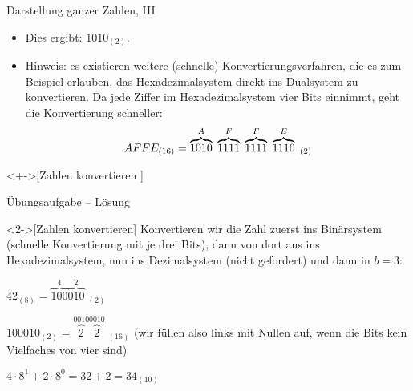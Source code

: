 \begin{frame}[fragile]{Darstellung ganzer Zahlen, III}
\begin{itemize}[<+(1)->]
    \item Dies ergibt: \(1010_{(2)}\).
    \item Hinweis: es existieren weitere (schnelle) Konvertierungsverfahren,\pause{} die es zum Beispiel erlauben, das Hexadezimalsystem direkt ins Dualsystem zu konvertieren.\pause{} Da jede Ziffer im Hexadezimalsystem vier Bits einnimmt, geht die Konvertierung schneller:\pause{} \[
        AFFE_{(16)} = \overbrace{1010}^{A}\;\overbrace{1111}^{F}\;\overbrace{1111}^{F}\;\overbrace{1110}^{E}\;{}_{(2)}\vspace*{-0.4cm}
    \]
\end{itemize}
\ifull{}%
\begin{exercise}<+->[Zahlen konvertieren ]
\end{exercise}\fi
\end{frame}

\ifull
\begin{frame}[c]{Übungsaufgabe -- Lösung}
\begin{solve}<2->[Zahlen konvertieren]
    \pause{}Konvertieren wir die Zahl zuerst ins Binärsystem (schnelle Konvertierung mit je drei Bits),\pause{} dann von dort aus ins Hexadezimalsystem,\pause{} nun ins Dezimalsystem (nicht gefordert) und dann in \(b = 3\):\pause{} \begin{description}[b = 16]
        \item[b = 2] \(42_{(8)} = \overbrace{100}^{4}\overbrace{010}^{2}\;{}_{(2)}\)\medskip
        \item[b = 16] \(100010_{(2)} = \overbrace{2}^{0010}\overbrace{2}^{0010}\;{}_{(16)}\) (wir füllen also links mit Nullen auf, wenn die Bits kein Vielfaches von vier sind)\medskip
        \item[b = 10] \(4 \cdot 8^1 + 2 \cdot 8^0 = 32 + 2 = 34_{(10)}\)
    \end{description}
\end{solve}
\end{frame}

